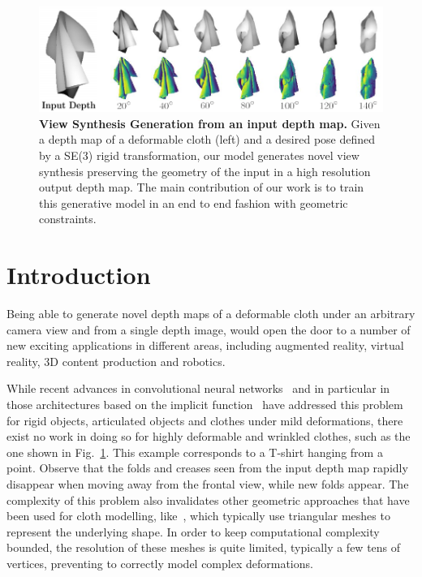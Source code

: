 \begin{figure}
\begin{center}
    \includegraphics[width=\linewidth]{main/chapter04/data/ipalm_cvpr_image_teaser.pdf}
\end{center}
    \caption[View Synthesis Generation from an input depth map]{\textbf{View Synthesis Generation from an input depth map.} Given a depth map of a deformable cloth (left) and a desired pose defined by a SE(3) rigid transformation, our model generates novel view synthesis preserving the geometry of the input in a high resolution output depth map. The main contribution of our work is to train this generative model in an end to end fashion with geometric constraints.}
    \label{fig:teaser}
\end{figure}

\section{Introduction}

Being able to generate novel depth maps of a deformable cloth under an arbitrary camera view and from a single depth image,   would open the door to a number of new exciting applications in different areas, including augmented reality, virtual reality, 3D content production and robotics.

While recent advances in  convolutional neural networks~\cite{varley2017shape, zhou2020learning,haeni2020corn,yan2016perspective} and in particular in those architectures based on the   implicit function~\cite{qiang-nips-2019, chibane20ifnet} have addressed this problem for rigid objects, articulated objects and clothes under mild deformations, there exist no work in doing so for highly deformable and wrinkled clothes, such as the one shown in Fig.~\ref{fig:teaser}. This example corresponds to a T-shirt hanging from a point. Observe that the folds and creases seen from the input depth map rapidly disappear when moving away from the frontal view, while new folds appear. The complexity of this problem also invalidates other geometric approaches that have been used for cloth modelling, like~\cite{salzmann-2010, pumarola2018geometry, golyanik2018hdm, Tsoli_2019_ICCV}, which typically use triangular meshes to represent the underlying shape. In order to keep computational complexity bounded, the resolution of these meshes is quite limited, typically a few tens of vertices, preventing to correctly model complex deformations. 

